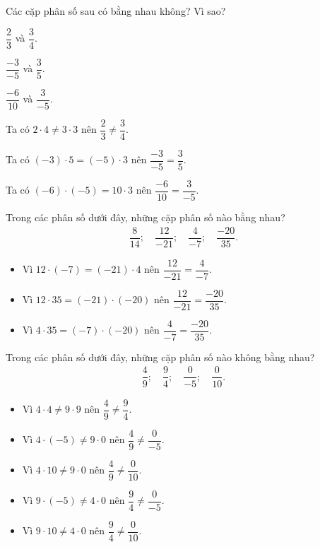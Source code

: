 \begin{vd}%
 Các cặp phân số sau có bằng nhau không? Vì sao?
 \begin{enumEX}{3}
  \item $\dfrac{2}{3}$ và $\dfrac{3}{4}$.
  \item $\dfrac{-3}{-5}$ và $\dfrac{3}{5}$.
  \item $\dfrac{-6}{10}$ và $\dfrac{3}{-5}$.
 \end{enumEX}
 \loigiai
  {
  \begin{enumEX}{1}
   \item Ta có $2\cdot 4 \neq 3\cdot 3$ nên $\dfrac{2}{3} \neq \dfrac{3}{4}$.
   \item Ta có $(-3)\cdot 5 = (-5)\cdot 3$ nên $\dfrac{-3}{-5}=\dfrac{3}{5}$.
   \item Ta có $(-6)\cdot (-5) = 10\cdot 3$ nên $\dfrac{-6}{10}=\dfrac{3}{-5}$.
  \end{enumEX}
  }
\end{vd}

\begin{vd}%
 Trong các phân số dưới đây, những cặp phân số nào bằng nhau?
 \begin{eqnarray*}
  \dfrac{8}{14};\quad \dfrac{12}{-21};\quad \dfrac{4}{-7};\quad \dfrac{-20}{35}.
 \end{eqnarray*}
 \loigiai
  {
  \begin{itemize}
   \item Vì $12\cdot(-7)=(-21)\cdot4$ nên $\dfrac{12}{-21}=\dfrac{4}{-7}$.
   \item Vì $12\cdot35=(-21)\cdot(-20)$ nên $\dfrac{12}{-21}=\dfrac{-20}{35}$.
   \item Vì $4\cdot35=(-7)\cdot(-20)$ nên $\dfrac{4}{-7}=\dfrac{-20}{35}$.
  \end{itemize}
  }
\end{vd}

\begin{vd}%
 Trong các phân số dưới đây, những cặp phân số nào không bằng nhau?
 \begin{eqnarray*}
  \dfrac{4}{9};\quad \dfrac{9}{4};\quad \dfrac{0}{-5};\quad \dfrac{0}{10}.
 \end{eqnarray*}
 \loigiai
  {
  \begin{itemize}
   \item Vì $4\cdot4 \neq 9\cdot9$ nên $\dfrac{4}{9}\neq\dfrac{9}{4}$.
   \item Vì $4\cdot(-5) \neq 9\cdot0$ nên $\dfrac{4}{9}\neq\dfrac{0}{-5}$.
   \item Vì $4\cdot10 \neq 9\cdot0$ nên $\dfrac{4}{9}\neq \dfrac{0}{10}$.
   \item Vì $9\cdot(-5) \neq 4\cdot0$ nên $\dfrac{9}{4}\neq\dfrac{0}{-5}$.
   \item Vì $9\cdot10 \neq 4\cdot0$ nên $\dfrac{9}{4}\neq\dfrac{0}{10}$.
  \end{itemize}
  }
\end{vd}

